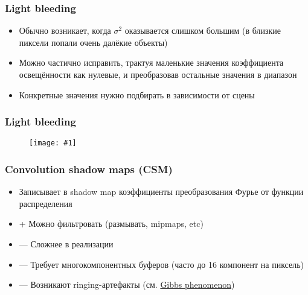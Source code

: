 \documentclass[10pt]{beamer}
\newcommand{\slideimage}[1]{
  \begin{figure}
    \begin{adjustbox}{width=\textwidth, totalheight=\textheight-2\baselineskip-2\baselineskip,keepaspectratio}
      \texttt{[image: \#1]}
    \end{adjustbox}
  \end{figure}
}
\begin{document}
\begin{frame}[fragile]
\frametitle{Light bleeding}
\begin{itemize}
\item Обычно возникает, когда \begin{math}\sigma^2\end{math} оказывается слишком большим (в близкие пиксели попали очень далёкие объекты)
\pause
\item Можно частично исправить, трактуя маленькие значения коэффициента освещённости как нулевые, и преобразовав остальные значения в диапазон \begin{math}[0, 1]\end{math}
\pause
\item Конкретные значения нужно подбирать в зависимости от сцены
\end{itemize}
\end{frame}

\begin{frame}[fragile]
\frametitle{Light bleeding}
\slideimage{light_bleeding_scheme.jpg}
\end{frame}

\begin{frame}[fragile]
\frametitle{Convolution shadow maps (CSM)}
\begin{itemize}
\item Записывает в shadow map коэффициенты преобразования Фурье от функции распределения
\pause
\item {\color{green}+} Можно фильтровать (размывать, mipmaps, etc)
\item {\color{red}—} Сложнее в реализации
\item {\color{red}—} Требует многокомпонентных буферов (часто до 16 компонент на пиксель)
\item {\color{red}—} Возникают ringing-артефакты (см. \href{https://en.wikipedia.org/wiki/Gibbs_phenomenon}{Gibbs phenomenon})
\end{itemize}
\end{frame}
\end{document}

